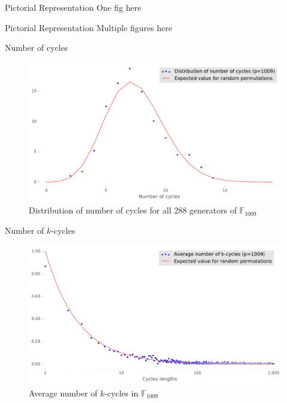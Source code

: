 \begin{frame}{Pictorial Representation}
    One fig here
\end{frame}

\begin{frame}{Pictorial Representation}
    Multiple figures here
\end{frame}

\begin{frame}{Number of cycles}
    \begin{figure}
        \centering
        \includegraphics[width=\textwidth]{figures/distribution_of_number_of_cycles_p_1009}
        \caption{Distribution of number of cycles for all 288 generators of $\mathbb{F}_{1009}$}
        \label{fig:elgamalPermCycles}
    \end{figure}
\end{frame}

\begin{frame}{Number of $k$-cycles}
    \begin{figure}
        \centering
        \includegraphics[width=\textwidth]{figures/average_number_of_k_cycles_p_1009}
        \caption{Average number of $k$-cycles in $\mathbb{F}_{1009}$}
        \label{fig:kcycles}
    \end{figure}
\end{frame}

